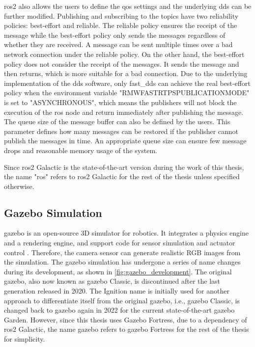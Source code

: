 \gls{ros}2 also allows the users to define the \gls{qos} settings and the underlying \gls{dds} can be further modified. Publishing and subscribing to the topics have two reliability policies: best-effort and reliable. The reliable policy ensures the receipt of the message while the best-effort policy only sends the messages regardless of whether they are received. A message can be sent multiple times over a bad network connection under the reliable policy. On the other hand, the best-effort policy does not consider the receipt of the messages. It sends the message and then returns, which is more suitable for a bad connection. Due to the underlying implementation of the \gls{dds} software, only \gls{fast_dds} can achieve the real best-effort policy when the environment variable "RMW\textunderscore FASTRTPS\textunderscore PUBLICATION\textunderscore MODE" is set to "ASYNCHRONOUS", which means the publishers will not block the execution of the \gls{ros} node and return immediately after publishing the message. The queue size of the message buffer can also be defined by the users. This parameter defines how many messages can be restored if the publisher cannot publish the messages in time. An appropriate queue size can ensure few message drops and reasonable memory usage of the system. 

Since \gls{ros}2 Galactic is the state-of-the-art version during the work of this thesis, the name "\gls{ros}" refers to \gls{ros}2 Galactic for the rest of the thesis unless specified otherwise. 

\subsection{Gazebo Simulation}


\gls{gazebo} is an open-source 3D simulator for robotics. It integrates a physics engine and a rendering engine, and support code for sensor simulation and actuator control \cite{GazeboWiki}. Therefore, the camera sensor can generate realistic RGB images from the simulation. The \gls{gazebo} simulation has undergone a series of name changes during its development, as shown in \cref{fig:gazebo_development}. The original \gls{gazebo}, also now known as \gls{gazebo} Classic, is discontinued after the last generation released in 2020. The Ignition name is initially used for another approach to differentiate itself from the original \gls{gazebo}, i.e., \gls{gazebo} Classic, is changed back to \gls{gazebo} again in 2022 for the current state-of-the-art \gls{gazebo} Garden. However, since this thesis uses Gazebo Fortress, due to a dependency of \gls{ros}2 Galactic, the name \gls{gazebo} refers to \gls{gazebo} Fortress for the rest of the thesis for simplicity. 

